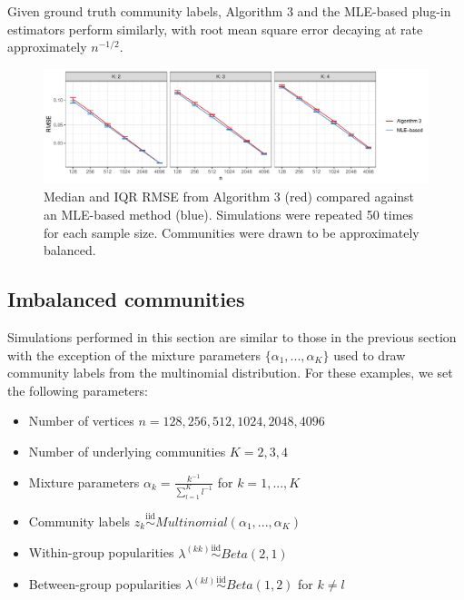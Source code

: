 \documentclass[
  12pt,
]{article}
\providecommand{\tightlist}{%
  \setlength{\itemsep}{0pt}\setlength{\parskip}{0pt}}
\begin{document}
Given ground truth community labels, Algorithm 3 and the MLE-based
plug-in estimators \cite{307cbeb9b1be48299388437423d94bf1}
\cite{noroozi2019estimation} perform similarly, with root mean square
error decaying at rate approximately \(n^{-1/2}\).

\begin{figure}[H]

{\centering \includegraphics{summary_files/figure-latex/lambda_est_k-1} 

}

\caption{Median and IQR RMSE from Algorithm 3 (red) compared against an MLE-based method (blue). Simulations were repeated 50 times for each sample size. Communities were drawn to be approximately balanced.}\label{fig:lambda_est_k}
\end{figure}

\hypertarget{imbalanced-communities}{%
\subsection{Imbalanced communities}\label{imbalanced-communities}}

Simulations performed in this section are similar to those in the
previous section with the exception of the mixture parameters
\(\{\alpha_1, ..., \alpha_K\}\) used to draw community labels from the
multinomial distribution. For these examples, we set the following
parameters:

\begin{itemize}
\tightlist
\item
  Number of vertices \(n = 128, 256, 512, 1024, 2048, 4096\)
\item
  Number of underlying communities \(K = 2, 3, 4\)
\item
  Mixture parameters \(\alpha_k = \frac{k^{-1}}{\sum_{l=1}^K l^{-1}}\)
  for \(k = 1, ..., K\)
\item
  Community labels
  \(z_k \stackrel{\text{iid}}{\sim}Multinomial(\alpha_1, ..., \alpha_K)\)
\item
  Within-group popularities
  \(\lambda^{(kk)} \stackrel{\text{iid}}{\sim}Beta(2, 1)\)
\item
  Between-group popularities
  \(\lambda^{(kl)} \stackrel{\text{iid}}{\sim}Beta(1, 2)\) for
  \(k \neq l\)
\end{itemize}
\end{document}
